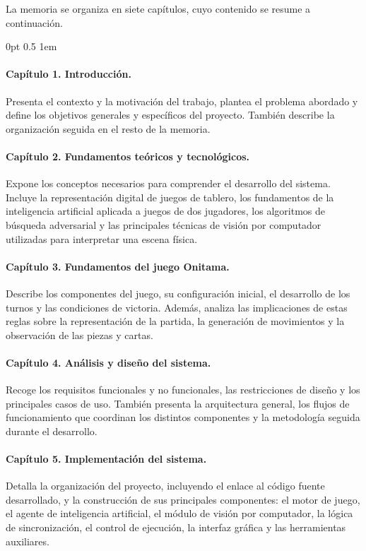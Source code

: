 La memoria se organiza en siete capítulos, cuyo contenido se resume a continuación.

\begingroup
\titlespacing*{\paragraph}
    {0pt}
    {0.5\baselineskip}
    {1em}

\paragraph{Capítulo 1. Introducción.} Presenta el contexto y la motivación del trabajo, plantea el problema abordado y define los objetivos generales y específicos del proyecto. También describe la organización seguida en el resto de la memoria.

\paragraph{Capítulo 2. Fundamentos teóricos y tecnológicos.} Expone los conceptos necesarios para comprender el desarrollo del sistema. Incluye la representación digital de juegos de tablero, los fundamentos de la inteligencia artificial aplicada a juegos de dos jugadores, los algoritmos de búsqueda adversarial y las principales técnicas de visión por computador utilizadas para interpretar una escena física.

\paragraph{Capítulo 3. Fundamentos del juego Onitama.} Describe los componentes del juego, su configuración inicial, el desarrollo de los turnos y las condiciones de victoria. Además, analiza las implicaciones de estas reglas sobre la representación de la partida, la generación de movimientos y la observación de las piezas y cartas.

\paragraph{Capítulo 4. Análisis y diseño del sistema.} Recoge los requisitos funcionales y no funcionales, las restricciones de diseño y los principales casos de uso. También presenta la arquitectura general, los flujos de funcionamiento que coordinan los distintos componentes y la metodología seguida durante el desarrollo.

\paragraph{Capítulo 5. Implementación del sistema.} Detalla la organización del proyecto, incluyendo el enlace al código fuente desarrollado, y la construcción de sus principales componentes: el motor de juego, el agente de inteligencia artificial, el módulo de visión por computador, la lógica de sincronización, el control de ejecución, la interfaz gráfica y las herramientas auxiliares.

